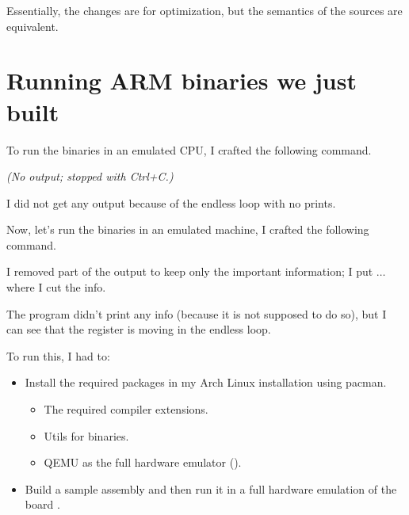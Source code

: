 Essentially, the changes are for optimization, but the semantics of the sources are equivalent.

\section{Running ARM binaries we just built}

To run the binaries in an emulated CPU, I crafted the following command.

\begin{terminal}
\textit{(No output; stopped with Ctrl+C.)}
\end{terminal}

I did not get any output because of the endless loop with no prints.

Now, let's run the binaries in an emulated machine, I crafted the following command.


I removed part of the output to keep only the important information; I put \(\ldots\) where I cut the info.

The program didn't print any info (because it is not supposed to do so), but I can see that the register  is moving in the endless loop.

To run this, I had to:
\begin{itemize}
    \item Install the required packages in my Arch Linux installation using pacman.
    \begin{itemize}
        \item The required compiler extensions.
        \item Utils for binaries.
        \item QEMU as the full hardware emulator ().
    \end{itemize}
    \item Build a sample assembly  and then run it in a full hardware emulation of the board .
\end{itemize}

